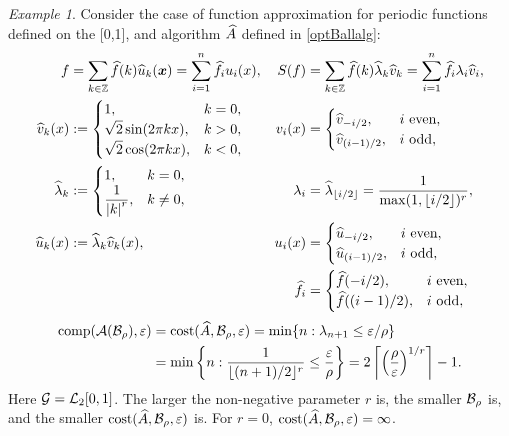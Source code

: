 \documentclass[final]{elsarticle}
\theoremstyle{definition}
\theoremstyle{remark}
\newtheorem{exmp}{Example}
\begin{document}
\begin{exmp} Consider the case of function approximation for periodic functions defined on the [0,1], and algorithm $\widehat{A}$ defined in \eqref{optBallalg}:
\begin{align*}
f &= \sum_{k \in \mathbb{Z}} \widehat{f}(k) \widehat{u}_{k} (\boldsymbol{x}) = \sum_{i=1}^n \widehat{f}_i u_i(x), 
& S(f) & = \sum_{k \in \mathbb{Z}} \widehat{f}(k) \widehat{\lambda}_k \widehat{v}_k = \sum_{i=1}^n \widehat{f}_i \lambda_i \widehat{v}_i, \\
\widehat{v}_{k} (x) &:= \begin{cases} 1, & k = 0, \\
\displaystyle \sqrt{2} \sin(2\pi k x), & k > 0, \\
\displaystyle \sqrt{2} \cos(2\pi k x), & k < 0, \\
\end{cases} 
& v_i(x) &= \begin{cases} \widehat{v}_{-i/2}, & i \text{ even},\\
\widehat{v}_{(i-1)/2}, & i \text{ odd},
\end{cases} \\
\widehat{\lambda}_{k} &:= \begin{cases} 1, & k = 0, \\
\displaystyle \frac{1}{\left \lvert k \right \rvert^r}, & k \ne 0,
\end{cases}
& \lambda_i &= \widehat{\lambda}_{\lfloor i/2\rfloor} = \frac{1}{\max(1,\lfloor i/2\rfloor)^r}, \\
\widehat{u}_{k} (x) &:= \widehat{\lambda}_k\widehat{v}_k(x),
& u_i(x) &= \begin{cases} \widehat{u}_{-i/2}, & i \text{ even},\\
\widehat{u}_{(i-1)/2}, & i \text{ odd},
\end{cases}
\\
&&\widehat{f}_i& = \begin{cases} \widehat{f}(-i/2), & i \text{ even},\\
\widehat{f}((i-1)/2), & i \text{ odd},
\end{cases}
\end{align*}
\begin{align*}
\operatorname{comp}(\mathcal{A}(\mathcal{B}_{\rho}),\varepsilon) &= \operatorname{cost}(\widehat{A},\mathcal{B}_{\rho},\varepsilon) 
=\min\{ n : \lambda_{n+1} \le \varepsilon/\rho \} \\
& = \min \left\{ n : \frac{1}{\lfloor (n+1)/2 \rfloor^r} \le \frac{\varepsilon}{\rho} \right\} 
= 2 \left \lceil \left(\frac{\rho}{\varepsilon} \right)^{1/r} \right \rceil - 1.
\end{align*}
Here $\mathcal{G}=\mathcal{L}_2[0,1]$.  The larger the non-negative parameter $r$ is, the smaller $\mathcal{B}_\rho$ is, and the smaller  $\operatorname{cost}(\widehat{A},\mathcal{B}_{\rho},\varepsilon)$ is.  For $r = 0$, $\operatorname{cost}(\widehat{A},\mathcal{B}_{\rho},\varepsilon) = \infty$.
\end{exmp}
\end{document}
